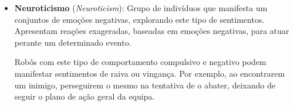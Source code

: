\begin{itemize}
    \item \textbf{Neuroticismo} (\textit{Neuroticism}): Grupo de indivíduos que manifesta um conjuntos de emoções negativas, explorando este tipo de sentimentos. 
    Apresentam reações exageradas, baseadas em emoções negativas, para atuar perante um determinado evento. 
    
    Robôs com este tipo de comportamento compulsivo e negativo podem manifestar sentimentos de raiva ou vingança.
    Por exemplo, ao encontrarem um inimigo, perseguirem o mesmo na tentativa de o abater, deixando de seguir o plano de ação geral da equipa. 

    
\end{itemize}

